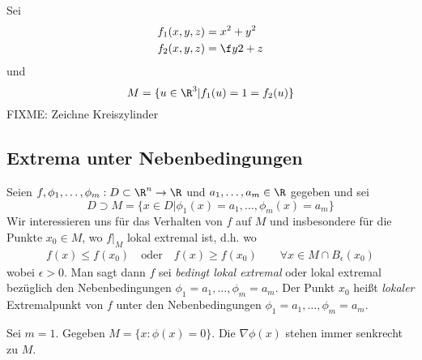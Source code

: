 \documentclass[a4paper,10pt]{scrartcl}
\begin{document}
\begin{ex*}
	Sei
	\begin{align*}
		f_1(x,y,z) &= x^2 +y^2\\
		f_2(x,y,z) &= \f y2 + z
	\end{align*}
	und
	\[
		M=\{ u\in\R^3 | f_1(u) = 1 = f_2(u)\}
	\]
	FIXME: Zeichne Kreiszylinder
\end{ex*}


\subsection{Extrema unter Nebenbedingungen}


Seien $f,\phi_1,\dotsc, \phi_m : D\subset \R^n \to \R$ und $a_1,\dotsc,a_m\in \R$ gegeben und sei
\[
	D \supset M = \{x\in D| \phi_1(x) = a_1, \dotsc, \phi_m(x) = a_m\}
\]
Wir interessieren uns für das Verhalten von $f$ auf $M$ und insbesondere für die Punkte $x_0\in M$, wo $f\big|_M$ lokal extremal ist, d.h. wo
\begin{align*}
	f(x) \le f(x_0)\quad \text{oder}\quad f(x) \ge f(x_0)\qquad \forall x\in M\cap B_\epsilon(x_0)
\end{align*}
wobei $\epsilon > 0$.
Man sagt dann $f$ sei \emph{bedingt lokal extremal} oder lokal extremal bezüglich den Nebenbedingungen $\phi_1 = a_1, \dotsc, \phi_m=a_m$.
Der Punkt $x_0$ heißt \emph{lokaler} Extremalpunkt von $f$ unter den Nebenbedingungen $\phi_1=a_1,\dotsc, \phi_m=a_m$.

\begin{ex*}
	Sei $m=1$.
	Gegeben $M = \{x:\phi(x)=0\}$.
	Die $\nabla \phi(x)$ stehen immer senkrecht zu $M$.
	\fixme
\end{ex*}
\end{document}

